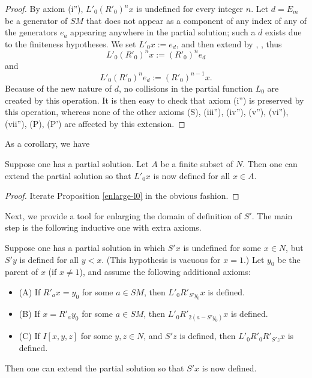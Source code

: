 \begin{proof} \leanok By axiom (i''), $L'_0 (R'_0)^n x$ is undefined for every integer $n$.  Let $d = E_m$ be a generator of $SM$ that does not appear as a component of any index of any of the generators $e_a$ appearing anywhere in the partial solution; such a $d$ exists due to the finiteness hypotheses.  We set $L'_0 x := e_d$, and then extend by , , thus
$$L'_0 (R'_0)^n x := (R'_0)^n e_d$$
and
$$L'_0 (R'_0)^n e_d := (R'_0)^{n-1} x.$$
Because of the new nature of $d$, no collisions in the partial function $L_0$ are created by this operation.  It is then easy to check that axiom (i'') is preserved by this operation, whereas none of the other axioms (S), (iii''), (iv''), (v''), (vi''), (vii''), (P), (P') are affected by this extension.
\end{proof}

As a corollary, we have

\begin{proposition}\label{enlarge-l0-many}\leanok  Suppose one has a partial solution.  Let $A$ be a finite subset of $N$.  Then one can extend the partial solution so that $L'_0 x$ is now defined for all $x \in A$.
\end{proposition}

\begin{proof} Iterate Proposition \ref{enlarge-l0} in the obvious fashion.
\end{proof}

Next, we provide a tool for enlarging the domain of definition of $S'$.  The main step is the following inductive one with extra axioms.

\begin{proposition}\label{enlarge-S-induct-axioms}\leanok  Suppose one has a partial solution in which $S'x$ is undefined for some $x \in N$, but $S'y$ is defined for all $y < x$.  (This hypothesis is vacuous for $x=1$.) Let $y_0$ be the parent of $x$ (if $x \neq 1$), and assume the following additional axioms:
  \begin{itemize}
    \item (A) If $R'_a x = y_0$ for some $a \in SM$, then $L'_0 R'_{S' y_0} x$ is defined.
    \item (B) If $x = R'_a y_0$ for some $a \in SM$, then $L'_0 R'_{2(a-S'y_0)} x$ is defined.
    \item (C)  If $I[x,y,z]$ for some $y,z \in N$, and $S'z$ is defined, then $L'_0 R'_0 R'_{S'z} x$ is defined.
    \end{itemize}
  Then one can extend the partial solution so that $S'x$ is now defined.
\end{proposition}

